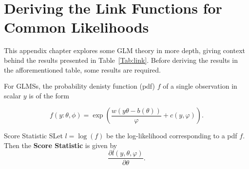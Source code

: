 \chapter{Deriving the Link Functions for Common Likelihoods}

This appendix chapter explores some GLM theory in more depth, giving context behind the results presented in Table~\ref{Tab:link}. Before deriving the results in the afforementioned table, some results are required.

For GLMSs, the probability denisty function (pdf) $f$ of a single observation in scalar $y$ is of the form

\[
    f(y:\theta,\phi) = \exp\left( \frac{w(y\theta - b(\theta))}{\varphi} + c(y, \varphi)\right). 
\]

\begin{definition}{Score Statistic}
    SLet $l = \log(f)$ be the log-likelihood corresponding to a pdf $f$. Then the \textbf{Score Statistic} is given by 
    \begin{equation}
        \frac{\partial l(y, \theta, \varphi)}{\partial \theta}.
    \end{equation}
\end{definition}


